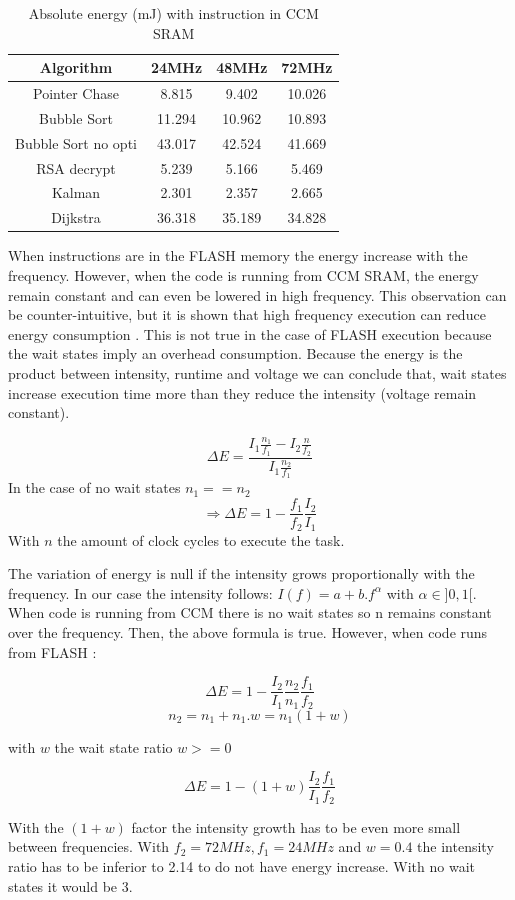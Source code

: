 \documentclass[conference]{IEEEtran}
\begin{document}
\begin{table}[h!]
\centering
\begin{tabular}{||c c c c||} 
 \hline
 Algorithm & 24MHz & 48MHz & 72MHz \\ [0.5ex] \hline\hline
 Pointer Chase & 8.815 & 9.402 & 10.026 \\ 
 Bubble Sort & 11.294 & 10.962 & 10.893 \\
 Bubble Sort no opti & 43.017 & 42.524 & 41.669 \\
 RSA decrypt & 5.239 & 5.166 & 5.469 \\
 Kalman & 2.301 & 2.357 & 2.665 \\
 Dijkstra & 36.318 & 35.189 & 34.828 \\[1ex] 
 \hline
\end{tabular}
\caption{Absolute energy (mJ) with instruction in CCM SRAM}
\label{energy_tab_code_ccm}
\end{table}

When instructions are in the FLASH memory the energy increase with the
frequency. However, when the code is running from CCM SRAM, the energy remain
constant and can even be lowered in high frequency. This observation can be
counter-intuitive, but it is shown that high frequency execution can reduce
energy consumption \cite{pwr_clock}. This is not true in the case of FLASH
execution because the wait states imply an overhead consumption. Because the
energy is the product between intensity, runtime and voltage we can conclude
that, wait states increase execution time more than they reduce the intensity
(voltage remain constant). 

\[\Delta E = \frac{I_1 \frac{n_1}{f_1} - I_2 \frac{n}{f_2}}{I_1 \frac{n_2}{f_1}} \]
In the case of no wait states $n_1 == n_2$
\[\Rightarrow \Delta E = 1 - \frac{f_1}{f_2} \frac{I_2}{I_1}\]
With $n$ the amount of clock cycles to execute the task.

The variation of energy is null if the intensity grows proportionally with the
frequency. In our case the intensity follows: $I(f) = a + b.f^\alpha$ with
$\alpha \in ]0,1[$. When code is running from CCM there is no wait states so n
remains constant over the frequency. Then, the above formula is true. However,
when code runs from FLASH :

\[\Delta E = 1 - \frac{I_2}{I_1} \frac{n_2}{n_1} \frac{f_1}{f_2}\]
\[n_2 = n_1 + n_1.w = n_1(1+w) \] 
\begin{center}
    with $w$ the wait state ratio $w >= 0$   
\end{center}
\[\Delta E = 1 - (1+w)\frac{I_2}{I_1} \frac{f_1}{f_2}\]

With the $(1+w)$ factor the intensity growth has to be even more small between
frequencies. With $f_2 = 72 MHz, f_1 = 24 MHz$ and $w = 0.4$ the intensity ratio
has to be inferior to 2.14 to do not have energy increase. With no wait states it would be 3.




\end{document}
